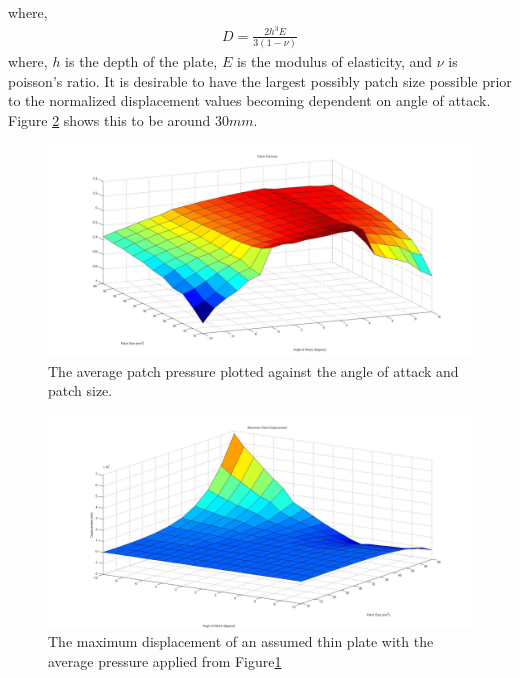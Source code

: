 \documentclass[11pt]{ucthesis}
\begin{document}
where,
\begin{eqnarray}
D = \frac{2h^3E}{3(1-\nu)}
\end{eqnarray}
where, $h$ is the depth of the plate, $E$ is the modulus of elasticity, and $\nu$ is poisson's ratio. It is desirable to have the largest possibly patch size possible prior to the normalized displacement values becoming dependent on angle of attack. Figure \ref{fig:PatchDisp} shows this to be around $30mm$. 
\begin{figure}[h]
\centering
\includegraphics[width=1\linewidth]{Figures/FreePatchPressure.jpg}
\caption{The average patch pressure plotted against the angle of attack and patch size.}
\label{fig:PProfile}
\end{figure}
\begin{figure}[h]
\centering
\includegraphics[width=1\linewidth]{Figures/MaximumPatchDisplacement.jpg}
\caption{The maximum displacement of an assumed thin plate with the average pressure applied from Figure\ref{fig:PProfile}}
\label{fig:PatchDisp}
\end{figure}
\end{document}
